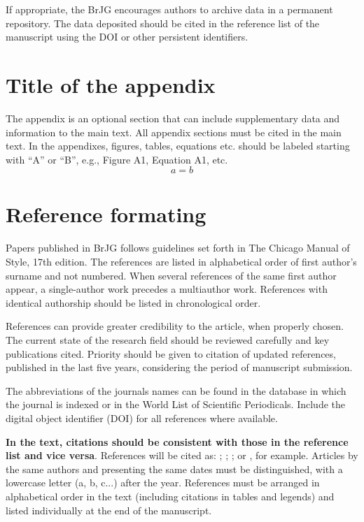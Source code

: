 \documentclass{BrJG_submit}
\begin{document}
If appropriate, the BrJG encourages authors to archive data in a permanent repository. The data deposited should be cited in the reference list of the manuscript using the DOI or other persistent identifiers.


\appendix

\section{Title of the appendix}
The appendix is an optional section that can include supplementary data and information to the main text. All appendix sections must be cited in the main text. In the appendixes, figures, tables, equations etc. should be labeled starting with ``A'' or ``B'', e.g., Figure A1, Equation A1, etc. 
\begin{equation}
	a = b
\end{equation}

\section*{Reference formating}
Papers published in BrJG follows guidelines set forth in The Chicago Manual of Style, 17th edition. The references are listed in alphabetical order of first author’s surname and not numbered. When several references of the same first author appear, a single-author work precedes a multiauthor work. References with identical authorship should be listed in chronological order.

References can provide greater credibility to the article, when properly chosen. The current state of the research field should be reviewed carefully and key publications cited. Priority should be given to citation of updated references, published in the last five years, considering the period of manuscript submission.

The abbreviations of the journals names can be found in the database in which the journal is indexed or in the World List of Scientific Periodicals. Include the digital object identifier (DOI) for all references where available.

{\bf In the text, citations should be consistent with those in the reference list and vice versa}. References will be cited as: \cite{OLIOSO1999341}; \cite{LEGCHENKO20023};  \cite{bott13}; or  \citep{OLIOSO1999341,LEGCHENKO20023,bott13}, for example. Articles by the same authors and presenting the same dates must be distinguished, with a lowercase letter (a, b, c...) after the year. References must be arranged in alphabetical order in the text (including citations in tables and legends) and listed individually at the end of the manuscript.
\end{document}

